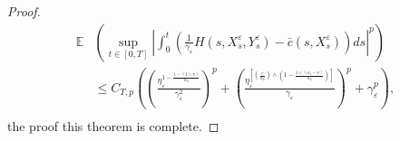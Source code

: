 \documentclass[11pt,reqno]{amsart}
\numberwithin{equation}{section}
\begin{document}
\begin{proof}
\begin{equation}\label{5.71}
	\begin{aligned}
		\mathbb{E}&\left( \sup_{t\in [0,T]}\left| \int_{0}^{t}\left(  \frac{1}{\gamma_{\varepsilon}}H(s,X_{s}^{\varepsilon},Y_{s}^{\varepsilon})- \bar{c}(s,X_{s}^{\varepsilon})\right) ds\right|^{p} \right)\\
		&\leq C_{T,p}\left(                                                                                                                                                                                                                                                                           \left(  \frac{\eta_{\varepsilon}^{1-\frac{1-(1\wedge v)}{\alpha_{2}}}}{\gamma_{\varepsilon}^{2}}\right) ^{p}+ \left( \frac{\eta_{\varepsilon}^{\left[ \left( \frac{v}{\alpha_{2}}\right) \wedge \left( 1-\frac{1\vee(\alpha_{1}-v)}{\alpha_{2}}\right) \right] }}{\gamma_{\varepsilon} } \right) ^{p}+\gamma_{\varepsilon}^{p}\right) ,\\
	\end{aligned}
\end{equation}
the proof this theorem is complete.
\end{proof}
\end{document}
